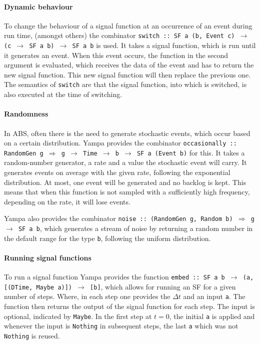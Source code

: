 \paragraph{Dynamic behaviour}
To change the behaviour of a signal function at an occurrence of an event during run time, (amongst others) the combinator \texttt{switch :: SF a (b, Event c) $\rightarrow$ (c $\rightarrow$ SF a b) $\rightarrow$ SF a b} is used. It takes a signal function, which is run until it generates an event. When this event occurs, the function in the second argument is evaluated, which receives the data of the event and has to return the new signal function. This new signal function will then replace the previous one. The semantics of \texttt{switch} are that the signal function, into which is switched, is also executed at the time of switching.

\paragraph{Randomness}
In ABS, often there is the need to generate stochastic events, which occur based on a certain distribution. Yampa provides the combinator \texttt{occasionally :: RandomGen g $\Rightarrow$ g $\rightarrow$ Time $\rightarrow$ b $\rightarrow$ SF a (Event b)} for this. It takes a random-number generator, a rate and a value the stochastic event will carry. It generates events on average with the given rate, following the exponential distribution. At most, one event will be generated and no backlog is kept. This means that when this function is not sampled with a sufficiently high frequency, depending on the rate, it will lose events.

Yampa also provides the combinator \texttt{noise :: (RandomGen g, Random b) $\Rightarrow$ g $\rightarrow$ SF a b}, which generates a stream of noise by returning a random number in the default range for the type \texttt{b}, following the uniform distribution.

\paragraph{Running signal functions}
To run a signal function Yampa provides the function \texttt{embed :: SF a b $\rightarrow$ (a, [(DTime, Maybe a)]) $\rightarrow$ [b]}, which allows for running an SF for a given number of steps. Where, in each step one provides the $\Delta t$ and an input \texttt{a}. The function then returns the output of the signal function for each step. The input is optional, indicated by \texttt{Maybe}. In the first step at $t = 0$, the initial \texttt{a} is applied and whenever the input is \texttt{Nothing} in subsequent steps, the last \texttt{a} which was not \texttt{Nothing} is reused.

